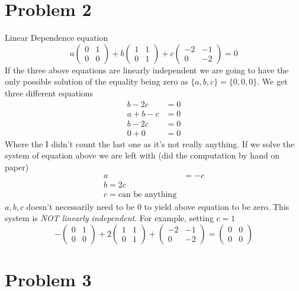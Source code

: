 \documentclass[letter]{article}
\begin{document}
\section*{Problem 2}
Linear Dependence equation 
\[
a 
\begin{pmatrix} 0&1\\0&0 \end{pmatrix} 
+
b
\begin{pmatrix} 1&1\\0&1 \end{pmatrix} 
+
c
\begin{pmatrix} -2&-1\\0&-2 \end{pmatrix}  = 0
\]
If the three above equations are linearly independent we are going to have the only possible solution of the equality being zero as $\{a,b,c\} = \{0,0,0\}$. We get three different equations 
\begin{align*}
	b- 2c &= 0 \\
	a+b-c&= 0 \\
	b - 2c &= 0 \\
	0 + 0 &= 0 
\end{align*}
Where the I didn't count the last one as it's not really anything. If we solve the system of equation above we are left with (did the computation by hand on paper)
\begin{align*}
	a &= -c \\
	b = 2 c \\
	c = \text{can be anything}
\end{align*}
$a,b,c$ doesn't necessarily need to be $0$ to yield above equation to be zero. This system is \emph{NOT linearly independent}. For example, setting $c = 1$ 
\[
	- \begin{pmatrix} 0&1\\0&0 \end{pmatrix} + 2 \begin{pmatrix} 1 & 1\\0&1 \end{pmatrix} + 
	\begin{pmatrix} -2 & -1 \\ 0 & -2 \end{pmatrix}  = \begin{pmatrix} 0&0\\0&0 \end{pmatrix} 
\] 

\section*{Problem 3}
\end{document}
